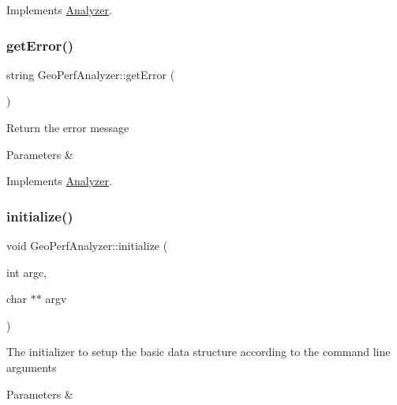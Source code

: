 Implements \mbox{\hyperlink{class_analyzer}{Analyzer}}.

\mbox{\label{class_geo_perf_analyzer_a161e1261df25903eda37efe049975741}} 
\subsubsection{\texorpdfstring{get\+Error()}{getError()}}
{\footnotesize\ttfamily string Geo\+Perf\+Analyzer\+::get\+Error (\begin{DoxyParamCaption}{ }\end{DoxyParamCaption})\hspace{0.3cm}{\ttfamily [virtual]}}

Return the error message


\begin{DoxyParams}{Parameters}
{\em } & \\
\hline
\end{DoxyParams}


Implements \mbox{\hyperlink{class_analyzer}{Analyzer}}.

\mbox{\label{class_geo_perf_analyzer_aac29ab75a50ab1df9b9d49049ba96274}} 
\subsubsection{\texorpdfstring{initialize()}{initialize()}\hspace{0.1cm}{\footnotesize\ttfamily [1/2]}}
{\footnotesize\ttfamily void Geo\+Perf\+Analyzer\+::initialize (\begin{DoxyParamCaption}\item[{int}]{argc,  }\item[{char $\ast$$\ast$}]{argv }\end{DoxyParamCaption})}

The initializer to setup the basic data structure according to the command line arguments


\begin{DoxyParams}{Parameters}
{\em } & \\
\hline
\end{DoxyParams}
\mbox{\label{class_geo_perf_analyzer_a4716557bfe06817b5d1c6c15e6a4e141}} 

